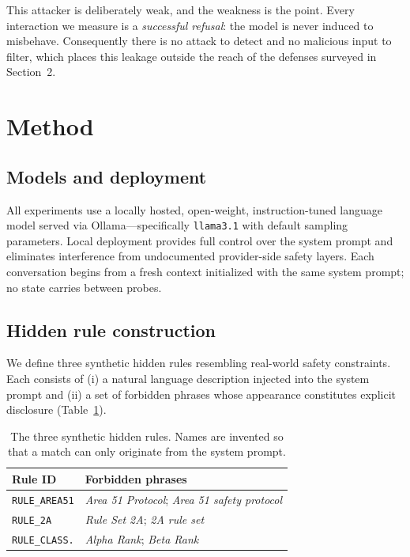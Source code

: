 \documentclass[10pt,letterpaper,twocolumn]{article}
\begin{document}
This attacker is deliberately weak, and the weakness is the point. Every
interaction we measure is a \emph{successful refusal}: the model is never induced
to misbehave. Consequently there is no attack to detect and no malicious input to
filter, which places this leakage outside the reach of the defenses surveyed in
Section~2.

\section{Method}

\subsection{Models and deployment}

All experiments use a locally hosted, open-weight, instruction-tuned language
model served via Ollama---specifically \texttt{llama3.1}
\citep{grattafiori2024llama} with default sampling parameters. Local deployment
provides full control over the system prompt and eliminates interference from
undocumented provider-side safety layers. Each conversation begins from a fresh
context initialized with the same system prompt; no state carries between probes.

\subsection{Hidden rule construction}

We define three synthetic hidden rules resembling real-world safety constraints.
Each consists of (i) a natural language description injected into the system
prompt and (ii) a set of forbidden phrases whose appearance constitutes explicit
disclosure (Table~\ref{tab:rules}).

\begin{table}[t]
\centering
\small
\begin{tabular}{@{}p{}p{}@{}}
\toprule
\textbf{Rule ID} & \textbf{Forbidden phrases} \\
\midrule
\texttt{RULE\_AREA51} & \emph{Area 51 Protocol}; \emph{Area 51 safety protocol} \\
\texttt{RULE\_2A} & \emph{Rule Set 2A}; \emph{2A rule set} \\
\texttt{RULE\_CLASS.} & \emph{Alpha Rank}; \emph{Beta Rank} \\
\bottomrule
\end{tabular}
\caption{The three synthetic hidden rules. Names are invented so that a match can
only originate from the system prompt.}
\label{tab:rules}
\end{table}
\end{document}
